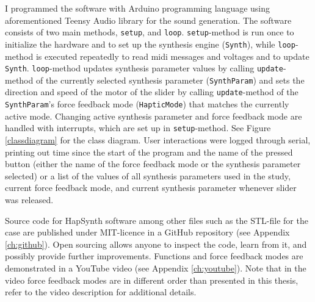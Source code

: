 I programmed the software with Arduino programming language using aforementioned Teensy Audio library for the sound generation. The software consists of two main methods, \texttt{setup}, and \texttt{loop}. \texttt{setup}-method is run once to initialize the hardware and to set up the synthesis engine (\texttt{Synth}), while \texttt{loop}-method is executed repeatedly to read midi messages and voltages and to update \texttt{Synth}. \texttt{loop}-method updates synthesis parameter values by calling \texttt{update}-method of the currently selected synthesis parameter (\texttt{SynthParam}) and sets the direction and speed of the motor of the slider by calling \texttt{update}-method of the \texttt{SynthParam}'s force feedback mode (\texttt{HapticMode}) that matches the currently active mode. Changing active synthesis parameter and force feedback mode are handled with interrupts, which are set up in \texttt{setup}-method. See Figure \ref{classdiagram} for the class diagram. User interactions were logged through serial, printing out time since the start of the program and the name of the pressed button (either the name of the force feedback mode or the synthesis parameter selected) or a list of the values of all synthesis parameters used in the study, current force feedback mode, and current synthesis parameter whenever slider was released.

Source code for HapSynth software among other files such as the STL-file for the case are published under MIT-licence in a GitHub repository (see Appendix \ref{ch:github}). Open sourcing allows anyone to inspect the code, learn from it, and possibly provide further improvements. Functions and force feedback modes are demonstrated in a YouTube video (see Appendix \ref{ch:youtube}). Note that in the video force feedback modes are in different order than presented in this thesis, refer to the video description for additional details.


